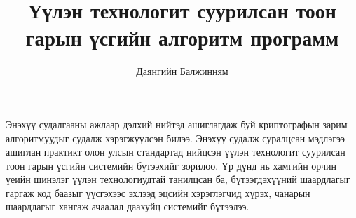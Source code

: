 \documentclass[12pt,A4]{report}
\begin{document}

\title{Үүлэн технологит суурилсан тоон гарын үсгийн алгоритм программ}
\author{Даянгийн Балжинням}













% 


Энэхүү судалгааны ажлаар дэлхий нийтэд ашиглагдаж буй криптографын зарим алгоритмуудыг судалж хэрэгжүүлсэн билээ. Энэхүү судалж суралцсан мэдлэгээ ашиглан практикт олон улсын стандартад нийцсэн үүлэн технологит суурилсан тоон гарын үсгийн системийн бүтээхийг зорилоо. Үр дүнд нь хамгийн орчин үеийн шинэлэг үүлэн технологиудтай танилцсан ба, бүтээгдэхүүний шаардлагыг гаргаж код баазыг үүсгэхээс эхлээд эцсийн хэрэглэгчид хүрэх, чанарын шаардлагыг хангаж ачаалал даахуйц системийг бүтээлээ.
\end{document}
